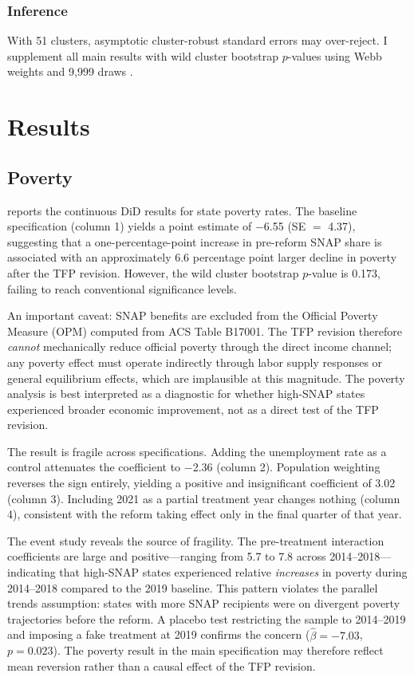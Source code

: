 \documentclass[12pt]{article}
\begin{document}
\subsubsection*{Inference} With 51 clusters, asymptotic cluster-robust standard errors may over-reject. I supplement all main results with wild cluster bootstrap $p$-values using Webb weights and 9,999 draws \citep{cameron2008bootstrap, webb2023reworking}.

\section{Results}
\label{sec:results}

\subsection{Poverty}

 reports the continuous DiD results for state poverty rates. The baseline specification (column 1) yields a point estimate of $-$6.55 (SE $=$ 4.37), suggesting that a one-percentage-point increase in pre-reform SNAP share is associated with an approximately 6.6 percentage point larger decline in poverty after the TFP revision. However, the wild cluster bootstrap $p$-value is 0.173, failing to reach conventional significance levels.

An important caveat: SNAP benefits are excluded from the Official Poverty Measure (OPM) computed from ACS Table B17001. The TFP revision therefore \textit{cannot} mechanically reduce official poverty through the direct income channel; any poverty effect must operate indirectly through labor supply responses or general equilibrium effects, which are implausible at this magnitude. The poverty analysis is best interpreted as a diagnostic for whether high-SNAP states experienced broader economic improvement, not as a direct test of the TFP revision.

The result is fragile across specifications. Adding the unemployment rate as a control attenuates the coefficient to $-$2.36 (column 2). Population weighting reverses the sign entirely, yielding a positive and insignificant coefficient of 3.02 (column 3). Including 2021 as a partial treatment year changes nothing (column 4), consistent with the reform taking effect only in the final quarter of that year.



The event study reveals the source of fragility. The pre-treatment interaction coefficients are large and positive---ranging from 5.7 to 7.8 across 2014--2018---indicating that high-SNAP states experienced relative \textit{increases} in poverty during 2014--2018 compared to the 2019 baseline. This pattern violates the parallel trends assumption: states with more SNAP recipients were on divergent poverty trajectories before the reform. A placebo test restricting the sample to 2014--2019 and imposing a fake treatment at 2019 confirms the concern ($\hat{\beta} = -7.03$, $p = 0.023$). The poverty result in the main specification may therefore reflect mean reversion rather than a causal effect of the TFP revision.
\end{document}
